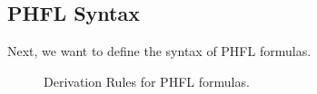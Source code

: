 \subsection{PHFL Syntax}\label{subsec:phflSyntax}

Next, we want to define the syntax of PHFL formulas.

\begin{figure}
    \caption{Derivation Rules for PHFL formulas.}
    \label{figure:phfl-typing-rules}
\end{figure}

